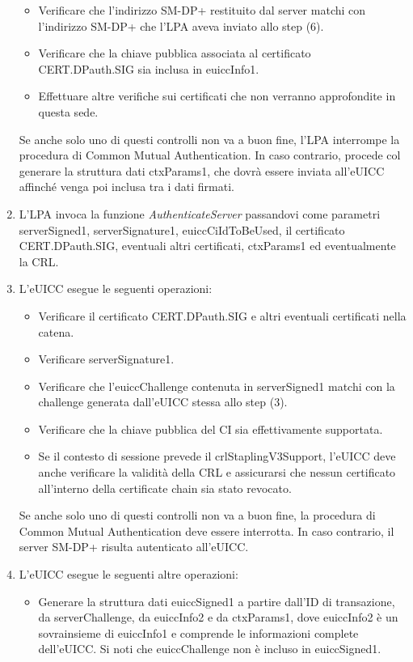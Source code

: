 \documentclass[10pt, twoside, openany]{book}
\begin{document}
\begin{enumerate}
\begin{itemize}[itemsep=0pt]
\item Verificare che l'indirizzo SM-DP+ restituito dal server matchi con l'indirizzo SM-DP+ che l'LPA aveva inviato allo step (6).
\item Verificare che la chiave pubblica associata al certificato CERT.DPauth.SIG sia inclusa in euiccInfo1.
\item Effettuare altre verifiche sui certificati che non verranno approfondite in questa sede.
\end{itemize}
Se anche solo uno di questi controlli non va a buon fine, l'LPA interrompe la procedura di Common Mutual Authentication. In caso contrario, procede col generare la struttura dati ctxParams1, che dovrà essere inviata all'eUICC affinché venga poi inclusa tra i dati firmati.
\item L'LPA invoca la funzione \textit{AuthenticateServer} passandovi come parametri serverSigned1, serverSignature1, euiccCiIdToBeUsed, il certificato CERT.DPauth.SIG, eventuali altri certificati, ctxParams1 ed eventualmente la CRL.
\item L'eUICC esegue le seguenti operazioni:
\begin{itemize}[itemsep=0pt]
\item Verificare il certificato CERT.DPauth.SIG e altri eventuali certificati nella catena.
\item Verificare serverSignature1.
\item Verificare che l'euiccChallenge contenuta in serverSigned1 matchi con la challenge generata dall'eUICC stessa allo step (3).
\item Verificare che la chiave pubblica del CI sia effettivamente supportata.
\item Se il contesto di sessione prevede il crlStaplingV3Support, l'eUICC deve anche verificare la validità della CRL e assicurarsi che nessun certificato all'interno della certificate chain sia stato revocato.
\end{itemize}
Se anche solo uno di questi controlli non va a buon fine, la procedura di Common Mutual Authentication deve essere interrotta. In caso contrario, il server SM-DP+ risulta autenticato all'eUICC.
\item L'eUICC esegue le seguenti altre operazioni:
\begin{itemize}[itemsep=0pt]
\item Generare la struttura dati euiccSigned1 a partire dall'ID di transazione, da serverChallenge, da euiccInfo2 e da ctxParams1, dove euiccInfo2 è un  sovrainsieme di euiccInfo1 e comprende le informazioni complete dell'eUICC. Si noti che euiccChallenge non è incluso in euiccSigned1.

\end{itemize}
\end{enumerate}
\end{document}
